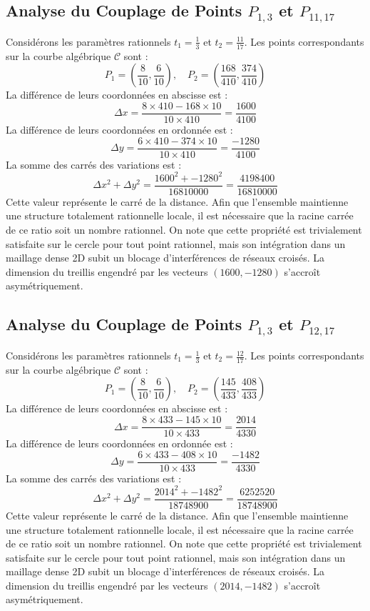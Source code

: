 \documentclass[12pt, a4paper]{article}
\begin{document}
\subsection{Analyse du Couplage de Points $P_{1,3}$ et $P_{11,17}$}
Considérons les paramètres rationnels $t_1 = \frac{1}{3}$ et $t_2 = \frac{11}{17}$.
Les points correspondants sur la courbe algébrique $\mathcal{C}$ sont :
$$ P_1 = \left( \frac{8}{10}, \frac{6}{10} \right), \quad P_2 = \left( \frac{168}{410}, \frac{374}{410} \right) $$
La différence de leurs coordonnées en abscisse est :
$$ \Delta x = \frac{8 \times 410 - 168 \times 10}{10 \times 410} = \frac{1600}{4100} $$
La différence de leurs coordonnées en ordonnée est :
$$ \Delta y = \frac{6 \times 410 - 374 \times 10}{10 \times 410} = \frac{-1280}{4100} $$
La somme des carrés des variations est :
$$ \Delta x^2 + \Delta y^2 = \frac{ 1600^2 + -1280^2 }{ 16810000 } = \frac{ 4198400 }{ 16810000 } $$
Cette valeur représente le carré de la distance. Afin que l'ensemble maintienne une structure totalement rationnelle locale, il est nécessaire que la racine carrée de ce ratio soit un nombre rationnel. On note que cette propriété est trivialement satisfaite sur le cercle pour tout point rationnel, mais son intégration dans un maillage dense 2D subit un blocage d'interférences de réseaux croisés. La dimension du treillis engendré par les vecteurs $( 1600, -1280 )$ s'accroît asymétriquement.


\subsection{Analyse du Couplage de Points $P_{1,3}$ et $P_{12,17}$}
Considérons les paramètres rationnels $t_1 = \frac{1}{3}$ et $t_2 = \frac{12}{17}$.
Les points correspondants sur la courbe algébrique $\mathcal{C}$ sont :
$$ P_1 = \left( \frac{8}{10}, \frac{6}{10} \right), \quad P_2 = \left( \frac{145}{433}, \frac{408}{433} \right) $$
La différence de leurs coordonnées en abscisse est :
$$ \Delta x = \frac{8 \times 433 - 145 \times 10}{10 \times 433} = \frac{2014}{4330} $$
La différence de leurs coordonnées en ordonnée est :
$$ \Delta y = \frac{6 \times 433 - 408 \times 10}{10 \times 433} = \frac{-1482}{4330} $$
La somme des carrés des variations est :
$$ \Delta x^2 + \Delta y^2 = \frac{ 2014^2 + -1482^2 }{ 18748900 } = \frac{ 6252520 }{ 18748900 } $$
Cette valeur représente le carré de la distance. Afin que l'ensemble maintienne une structure totalement rationnelle locale, il est nécessaire que la racine carrée de ce ratio soit un nombre rationnel. On note que cette propriété est trivialement satisfaite sur le cercle pour tout point rationnel, mais son intégration dans un maillage dense 2D subit un blocage d'interférences de réseaux croisés. La dimension du treillis engendré par les vecteurs $( 2014, -1482 )$ s'accroît asymétriquement.
\end{document}
